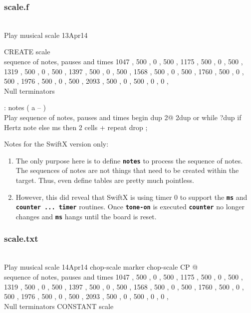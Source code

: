 \documentclass[10pt,english]{article}
\begin{document}
\subsubsection{scale.f}

\nwenddocs{}\endmoddef
\\ Play musical scale                      13Apr14

CREATE scale \\ sequence of notes, pauses and times
   1047 , 500 , 0 , 500 , 1175 , 500 , 0 , 500 ,
   1319 , 500 , 0 , 500 , 1397 , 500 , 0 , 500 ,
   1568 , 500 , 0 , 500 , 1760 , 500 , 0 , 500 ,
   1976 , 500 , 0 , 500 , 2093 , 500 , 0 , 500 ,
      0 ,   0 ,  \\ Null terminators

: notes ( a -- ) \\ Play sequence of notes, pauses and times
   begin  dup 2@  2dup or while  ?dup if
         Hertz note  else  ms
      then  2 cells +
   repeat  drop ;
\nwendcode{}\nwdocspar

Notes for the SwiftX version only:
\begin{enumerate}
\item The only purpose here is to define \texttt{\textbf{notes}} to process
the sequence of notes. The sequences of notes are not things that
need to be created within the target. Thus, even define tables are
pretty much pointless.
\item However, this did reveal that SwiftX is using timer 0 to support the
\texttt{\textbf{ms}} and \texttt{\textbf{counter ... timer}} routines.
Once \texttt{\textbf{tone-on}} is executed \texttt{\textbf{counter}}
no longer changes and \texttt{\textbf{ms}} hangs until the board is
reset.
\end{enumerate}

\subsubsection{scale.txt}

\nwenddocs{}\endmoddef
\\ Play musical scale                      14Apr14
chop-scale
marker chop-scale
CP @  \\ sequence of notes, pauses and times
   1047 , 500 , 0 , 500 , 1175 , 500 , 0 , 500 ,
   1319 , 500 , 0 , 500 , 1397 , 500 , 0 , 500 ,
   1568 , 500 , 0 , 500 , 1760 , 500 , 0 , 500 ,
   1976 , 500 , 0 , 500 , 2093 , 500 , 0 , 500 ,
      0 ,   0 ,  \\ Null terminators
CONSTANT scale
\end{document}
